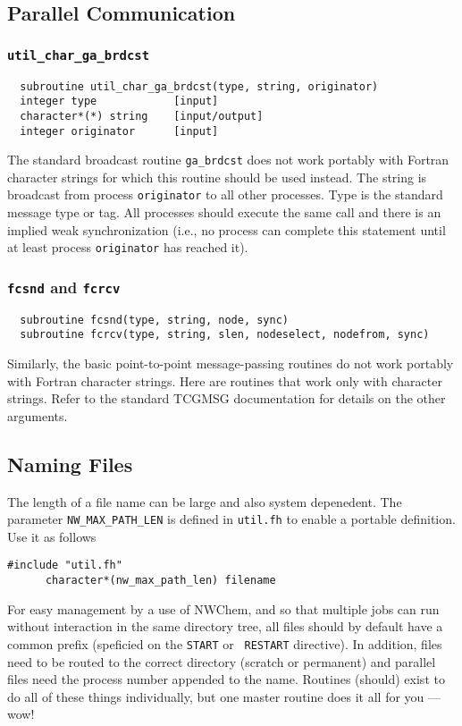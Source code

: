 \subsection{Parallel Communication}

\subsubsection{{\tt util\_char\_ga\_brdcst}}
\begin{verbatim}
  subroutine util_char_ga_brdcst(type, string, originator)
  integer type            [input]
  character*(*) string    [input/output]
  integer originator      [input]
\end{verbatim}
The standard broadcast routine {\tt ga\_brdcst} does not work portably
with Fortran character strings for which this routine should be used
instead.  The string is broadcast from process \verb+originator+ to all other
processes.  Type is the standard message type or tag. All processes
should execute the same call and there is an implied weak
synchronization (i.e., no process can complete this statement until at
least process \verb+originator+ has reached it).

\subsubsection{{\tt fcsnd} and {\tt fcrcv}}
\begin{verbatim}
  subroutine fcsnd(type, string, node, sync)
  subroutine fcrcv(type, string, slen, nodeselect, nodefrom, sync)
\end{verbatim}
Similarly, the basic point-to-point message-passing routines do not
work portably with Fortran character strings.  Here are routines that
work only with character strings.  Refer to the standard TCGMSG
documentation for details on the other arguments.

\subsection{Naming Files}

The length of a file name can be large and also system depenedent.
The parameter \verb+NW_MAX_PATH_LEN+ is defined in \verb+util.fh+ to
enable a portable definition.  Use it as follows
\begin{verbatim}
#include "util.fh"
      character*(nw_max_path_len) filename
\end{verbatim}

For easy management by a use of NWChem, and so that multiple jobs can
run without interaction in the same directory tree, all files should
by default have a common prefix (speficied on the {\tt START} or {\tt
  RESTART} directive).  In addition, files need to be routed to the
correct directory (scratch or permanent) and parallel files need the
process number appended to the name.  Routines (should) exist to do
all of these things individually, but one master routine does it all
for you --- wow!

